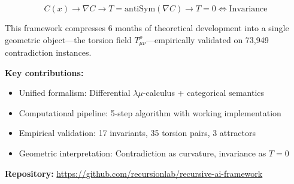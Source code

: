 \documentclass{article}
\begin{document}
\begin{equation}
\boxed{C(x) \to \nabla C \to T = \text{antiSym}(\nabla C) \to T=0 \Longleftrightarrow \text{Invariance}}
\end{equation}

This framework compresses 6 months of theoretical development into a single geometric object—the torsion field $T^\rho_{\mu\nu}$—empirically validated on 73,949 contradiction instances.

\textbf{Key contributions:}
\begin{itemize}
    \item Unified formalism: Differential $\lambda\mu$-calculus + categorical semantics
    \item Computational pipeline: 5-step algorithm with working implementation
    \item Empirical validation: 17 invariants, 35 torsion pairs, 3 attractors
    \item Geometric interpretation: Contradiction as curvature, invariance as $T=0$
\end{itemize}

\textbf{Repository:} \url{https://github.com/recursionlab/recursive-ai-framework}
\end{document}
